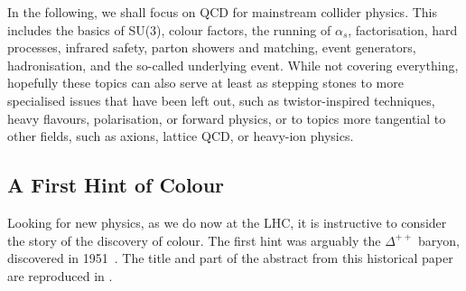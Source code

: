 In the following, we shall focus on QCD for mainstream 
collider physics. This includes the basics of SU(3), colour factors, the running
of $\alpha_s$, factorisation, 
hard processes, infrared safety, parton showers and matching, event generators, hadronisation, and the so-called underlying event. 
While not covering everything, hopefully these topics can also serve
at least as stepping stones to more specialised
issues that have been left out, such as twistor-inspired techniques, 
heavy flavours, polarisation, or forward physics, or to topics more tangential to
other fields, such as axions, lattice QCD, or heavy-ion physics.  

\subsection{A First Hint of Colour}
Looking for new physics, as we do now at the LHC, it is instructive to 
consider the story of the discovery of colour. The first hint was
arguably the $\Delta^{++}$ baryon, discovered in 
1951~\cite{Brueckner:1952zz}. The title and part of the abstract from this
historical paper are reproduced in .
